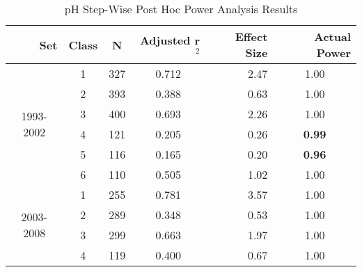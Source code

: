 \begin{table}\tiny
  \centering
	\caption{pH Step-Wise Post Hoc Power Analysis Results}
    \begin{tabular}{rrcrrr}
    \toprule
    Set   & Class & N     & Adjusted r$^2$ & \multicolumn{1}{p{.5cm}}{Effect Size} & Actual Power \\
    \midrule
    \multicolumn{1}{c}{\multirow{6}[1]{*}{\begin{sideways}1993-2002\end{sideways}}} & \multicolumn{1}{c}{1} & \multicolumn{1}{c}{327} & \multicolumn{1}{c}{0.712} & \multicolumn{1}{r}{2.47 } & \multicolumn{1}{c}{1.00 } \\
    \multicolumn{1}{c}{} & \multicolumn{1}{c}{2} & \multicolumn{1}{c}{393} & \multicolumn{1}{c}{0.388 } & \multicolumn{1}{r}{0.63 } & \multicolumn{1}{c}{1.00 } \\
    \multicolumn{1}{c}{} & \multicolumn{1}{c}{3} & \multicolumn{1}{c}{400} & \multicolumn{1}{c}{0.693 } & \multicolumn{1}{r}{2.26 } & \multicolumn{1}{c}{1.00 } \\
    \multicolumn{1}{c}{} & \multicolumn{1}{c}{4} & \multicolumn{1}{c}{121} & \multicolumn{1}{c}{0.205 } & \multicolumn{1}{r}{0.26 } & \multicolumn{1}{c}{\textbf{0.99}} \\
    \multicolumn{1}{c}{} & \multicolumn{1}{c}{5} & \multicolumn{1}{c}{116} & \multicolumn{1}{c}{0.165 } & \multicolumn{1}{r}{0.20 } & \multicolumn{1}{c}{\textbf{0.96}} \\
    \multicolumn{1}{c}{} & \multicolumn{1}{c}{6} & \multicolumn{1}{c}{110} & \multicolumn{1}{c}{0.505} & \multicolumn{1}{r}{1.02 } & \multicolumn{1}{c}{1.00 } \\\midrule
    \multicolumn{1}{c}{\multirow{6}[2]{*}{\begin{sideways}2003-2008\end{sideways}}} & \multicolumn{1}{c}{1} & \multicolumn{1}{c}{255} & \multicolumn{1}{c}{0.781 } & \multicolumn{1}{r}{3.57 } & \multicolumn{1}{c}{1.00 } \\
    \multicolumn{1}{c}{} & \multicolumn{1}{c}{2} & \multicolumn{1}{c}{289} & \multicolumn{1}{c}{0.348 } & \multicolumn{1}{r}{0.53 } & \multicolumn{1}{c}{1.00 } \\
    \multicolumn{1}{c}{} & \multicolumn{1}{c}{3} & \multicolumn{1}{c}{299} & \multicolumn{1}{c}{0.663 } & \multicolumn{1}{r}{1.97 } & \multicolumn{1}{c}{1.00 } \\
    \multicolumn{1}{c}{} & \multicolumn{1}{c}{4} & \multicolumn{1}{c}{119} & \multicolumn{1}{c}{0.400 } & \multicolumn{1}{r}{0.67 } & \multicolumn{1}{c}{1.00 } \\

\end{tabular}
\end{table}
